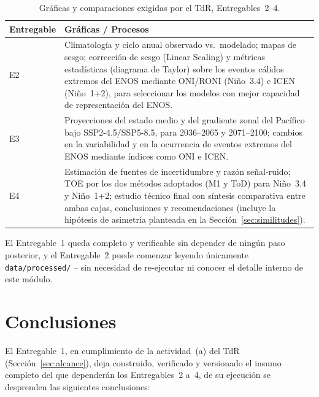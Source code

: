\documentclass[11pt,a4paper]{article}
\begin{document}
\begin{table}[htbp]
\caption{Gr\'aficas y comparaciones exigidas por el TdR, Entregables~2--4.}
\label{tab:roadmap}
\small
\begin{tabular}{@{}L{2.2cm}L{\dimexpr\textwidth-2.2cm-2\tabcolsep\relax}@{}}
\toprule
\textbf{Entregable} & \textbf{Gr\'aficas / Procesos} \\
\midrule
E2 & Climatolog\'ia y ciclo anual observado vs.\ modelado; mapas de sesgo; correcci\'on de sesgo (Linear Scaling) y m\'etricas estad\'isticas (diagrama de Taylor) sobre los eventos c\'alidos extremos del ENOS mediante ONI/RONI (Ni\~no~3.4) e ICEN (Ni\~no~1+2), para seleccionar los modelos con mejor capacidad de representaci\'on del ENOS. \\
E3 & Proyecciones del estado medio y del gradiente zonal del Pac\'ifico bajo SSP2-4.5/SSP5-8.5, para 2036--2065 y 2071--2100; cambios en la variabilidad y en la ocurrencia de eventos extremos del ENOS mediante \'indices como ONI e ICEN. \\
E4 & Estimaci\'on de fuentes de incertidumbre y raz\'on se\~nal-ruido; TOE por los dos m\'etodos adoptados (M1 y ToD) para Ni\~no~3.4 y Ni\~no~1+2; estudio t\'ecnico final con s\'intesis comparativa entre ambas cajas, conclusiones y recomendaciones (incluye la hip\'otesis de asimetr\'ia planteada en la Secci\'on~\ref{sec:similitudes}). \\
\bottomrule
\end{tabular}
\end{table}
El Entregable~1 queda completo y verificable sin depender de ning\'un paso posterior, y el Entregable~2 puede comenzar leyendo \'unicamente \texttt{data/processed/} -- sin necesidad de re-ejecutar ni conocer el detalle interno de este m\'odulo.


\newpage
\section{Conclusiones}
\label{sec:conclusiones}

El Entregable~1, en cumplimiento de la actividad~(a) del TdR (Secci\'on~\ref{sec:alcance}), deja construido, verificado y versionado el insumo completo del que depender\'an los Entregables~2 a~4, de su ejecuci\'on se desprenden las siguientes conclusiones:
\end{document}
